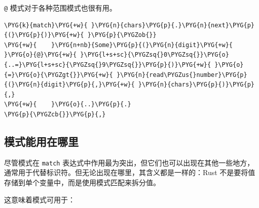 \texttt{@} 模式对于各种范围模式也很有用。

\begin{Verbatim}[commandchars=\\\{\},breaklines=true,breakanywhere=true,fontsize=\codefont,xleftmargin=17bp]
\PYG{k}{match}\PYG{+w}{ }\PYG{n}{chars}\PYG{p}{.}\PYG{n}{next}\PYG{p}{(}\PYG{p}{)}\PYG{+w}{ }\PYG{p}{\PYGZob{}}
\PYG{+w}{    }\PYG{n+nb}{Some}\PYG{p}{(}\PYG{n}{digit}\PYG{+w}{ }\PYG{o}{@}\PYG{+w}{ }\PYG{l+s+sc}{\PYGZsq{}0\PYGZsq{}}\PYG{o}{..=}\PYG{l+s+sc}{\PYGZsq{}9\PYGZsq{}}\PYG{p}{)}\PYG{+w}{ }\PYG{o}{=}\PYG{o}{\PYGZgt{}}\PYG{+w}{ }\PYG{n}{read\PYGZus{}number}\PYG{p}{(}\PYG{n}{digit}\PYG{p}{,}\PYG{+w}{ }\PYG{n}{chars}\PYG{p}{)}\PYG{p}{,}
\PYG{+w}{    }\PYG{o}{..}\PYG{p}{.}
\PYG{p}{\PYGZcb{}}\PYG{p}{,}
\end{Verbatim}

\subsection{模式能用在哪里}

尽管模式在 \texttt{match} 表达式中作用最为突出，但它们也可以出现在其他一些地方，通常用于代替标识符。但无论出现在哪里，其含义都是一样的：Rust 不是要将值存储到单个变量中，而是使用模式匹配来拆分值。

这意味着模式可用于：

